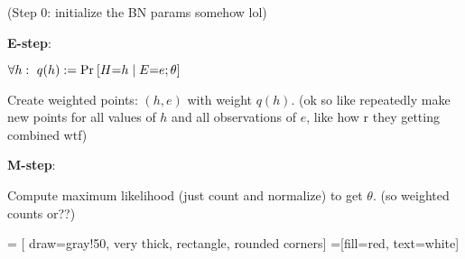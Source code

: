 \documentclass[11pt]{article}
\begin{document}
\begin{algorithm}
	
	(Step 0: initialize the BN params somehow lol)
	
	\textbf{E-step}:
	\begin{compactitem}
		\item $\forall h: ~ q(h) := \text{Pr}_{}\left[H {=} h \mid E {=} e; \theta\right]$
		
		\item Create weighted points: $(h, e)$ with weight $q(h)$. (ok so like repeatedly make new points for all values of $h$ and all observations of $e$, like how r they getting combined wtf)
	\end{compactitem}


	\textbf{M-step}:
	\begin{compactitem}
		\item Compute maximum likelihood (just count and normalize) to get $\theta$. (so weighted counts or??)
	\end{compactitem}


\end{algorithm}

 = [
	draw=gray!50, 
	very thick,
	rectangle, 
	rounded corners]
 =[fill=red, text=white]
\end{document}
